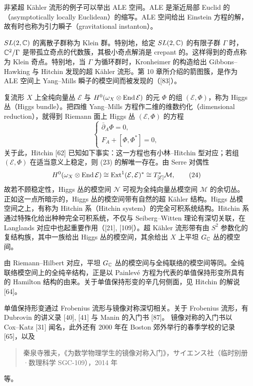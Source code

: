 非紧超 Kähler 流形的例子可以举出 ALE 空间。ALE 是渐近局部 Euclid 的（asymptotically locally Euclidean）的缩写。ALE 空间给出 Einstein 方程的解，故有时也称为引力瞬子（gravitational instanton）。

$SL(2,\mathbb{C})$ 的离散子群称为 Klein 群。特别地，给定 $SL(2,\mathbb{C})$ 的有限子群 $\Gamma$ 时，$\mathbb{C}^2/\Gamma$ 是带孤立奇点的代数簇，其极小奇点解消是 crepant 的。这样得到的奇点称为 Klein 奇点。特别地，当 $\Gamma$ 为循环群时，Kronheimer 的构造给出 Gibbons–Hawking 与 Hitchin 发现的超 Kähler 流形。第 10 章所介绍的箭图簇，是作为 ALE 空间上 Yang–Mills 瞬子的模空间而被发现的（[83]）。

复流形 $X$ 上全纯向量丛 $\mathcal{E}$ 与 $H^0(\omega_X\otimes\operatorname{End}\mathcal{E})$ 的元 $\Phi$ 的组 $(\mathcal{E},\Phi)$，称为 Higgs 丛（Higgs bundle）。把四维 Yang–Mills 方程作二维的维数约化（dimensional reduction），就得到 Riemann 面上 Higgs 丛 $(\mathcal{E},\Phi)$ 的方程
\begin{equation*}
\begin{cases}
\bar\partial_A\Phi=0,\\
F_A+[\Phi,\Phi^*]=0,
\end{cases}
\tag{23}
\end{equation*}
关于此，Hitchin [62] 已知如下事实：这一方程也有小林–Hitchin 型对应；若组 $(\mathcal{E},\Phi)$ 在适当意义上稳定，则 (23) 的解唯一存在。由 Serre 对偶性
\begin{equation*}
H^0(\omega_X\otimes\operatorname{End}\mathcal{E})\cong\operatorname{Ext}^1(\mathcal{E},\mathcal{E})^*\cong T^*_{[\mathcal{E}]}\mathcal{M},
\tag{24}
\end{equation*}
故若不顾稳定性，Higgs 丛的模空间 $\mathcal{N}$ 可视为全纯向量丛模空间 $\mathcal{M}$ 的余切丛。正如这一点所暗示的，Higgs 丛的模空间带有自然的超 Kähler 结构。Higgs 丛模空间之上，有称为 Hitchin 系（Hitchin system）的完全可积系统结构。Hitchin 系通过特殊化给出种种完全可积系统，不仅与 Seiberg–Witten 理论有深切关联，在 Langlands 对应中也起重要作用（[21], [109]）。超 Kähler 流形带有由 $S^2$ 参数化的复结构族，其中一族给出 Higgs 丛的模空间，其余给出 $X$ 上平坦 $G_{\mathbb{C}}$ 丛的模空间。

由 Riemann–Hilbert 对应，平坦 $G_{\mathbb{C}}$ 丛的模空间与全纯联络的模空间等同。全纯联络模空间上的全纯辛结构，正是以 Painlevé 方程为代表的单值保持形变所具有的 Hamilton 结构的由来。关于单值保持形变的辛几何侧面，见 Hitchin 的解说 [64]。

单值保持形变通过 Frobenius 流形与镜像对称深切相关。关于 Frobenius 流形，有 Dubrovin 的讲义录 [40], [41] 与 Manin 的入门书 [87]。
镜像对称的入门书以 Cox–Katz [31] 闻名，此外还有 2000 年在 Boston 郊外举行的春季学校的记录 [65]，以及
\begin{quote}
\noindent [秦泉寺 14] 秦泉寺雅夫，《为数学物理学生的镜像对称入门》，サイエンス社（临时别册·数理科学 SGC-109），2014 年
\end{quote}
等。
